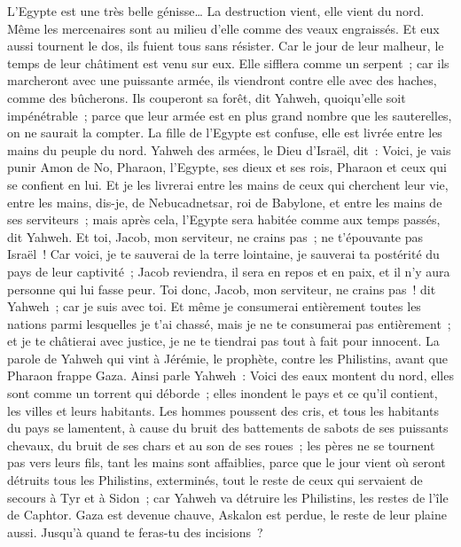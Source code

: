 \begin{multicols}{2}
L'Egypte est une très belle génisse… La destruction vient, elle vient du nord.
Même les mercenaires sont au milieu d'elle comme des veaux engraissés. Et eux aussi tournent le dos, ils fuient tous sans résister. Car le jour de leur malheur, le temps de leur châtiment est venu sur eux.
Elle sifflera comme un serpent~; car ils marcheront avec une puissante armée, ils viendront contre elle avec des haches, comme des bûcherons.
Ils couperont sa forêt, dit Yahweh, quoiqu'elle soit impénétrable~; parce que leur armée est en plus grand nombre que les sauterelles, on ne saurait la compter.
La fille de l'Egypte est confuse, elle est livrée entre les mains du peuple du nord.
Yahweh des armées, le Dieu d'Israël, dit~: Voici, je vais punir Amon de No, Pharaon, l'Egypte, ses dieux et ses rois, Pharaon et ceux qui se confient en lui.
Et je les livrerai entre les mains de ceux qui cherchent leur vie, entre les mains, dis-je, de Nebucadnetsar, roi de Babylone, et entre les mains de ses serviteurs~; mais après cela, l'Egypte sera habitée comme aux temps passés, dit Yahweh.
Et toi, Jacob, mon serviteur, ne crains pas~; ne t'épouvante pas Israël~! Car voici, je te sauverai de la terre lointaine, je sauverai ta postérité du pays de leur captivité~; Jacob reviendra, il sera en repos et en paix, et il n'y aura personne qui lui fasse peur.
Toi donc, Jacob, mon serviteur, ne crains pas~! dit Yahweh~; car je suis avec toi. Et même je consumerai entièrement toutes les nations parmi lesquelles je t'ai chassé, mais je ne te consumerai pas entièrement~; et je te châtierai avec justice, je ne te tiendrai pas tout à fait pour innocent.
\VerseOne{}La parole de Yahweh qui vint à Jérémie, le prophète, contre les Philistins, avant que Pharaon frappe Gaza.
Ainsi parle Yahweh~: Voici des eaux montent du nord, elles sont comme un torrent qui déborde~; elles inondent le pays et ce qu'il contient, les villes et leurs habitants. Les hommes poussent des cris, et tous les habitants du pays se lamentent,
à cause du bruit des battements de sabots de ses puissants chevaux, du bruit de ses chars et au son de ses roues~; les pères ne se tournent pas vers leurs fils, tant les mains sont affaiblies,
parce que le jour vient où seront détruits tous les Philistins, exterminés, tout le reste de ceux qui servaient de secours à Tyr et à Sidon~; car Yahweh va détruire les Philistins, les restes de l'île de Caphtor.
Gaza est devenue chauve, Askalon est perdue, le reste de leur plaine aussi. Jusqu'à quand te feras-tu des incisions~?

\end{multicols}
